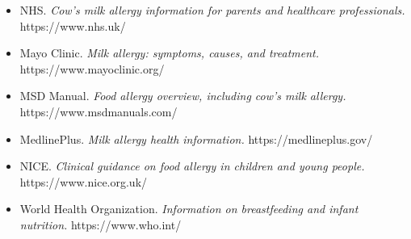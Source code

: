 \begin{itemize}
    \item NHS. \textit{Cow's milk allergy information for parents and healthcare professionals.} https://www.nhs.uk/
    \item Mayo Clinic. \textit{Milk allergy: symptoms, causes, and treatment.} https://www.mayoclinic.org/
    \item MSD Manual. \textit{Food allergy overview, including cow's milk allergy.} https://www.msdmanuals.com/
    \item MedlinePlus. \textit{Milk allergy health information.} https://medlineplus.gov/
    \item NICE. \textit{Clinical guidance on food allergy in children and young people.} https://www.nice.org.uk/
    \item World Health Organization. \textit{Information on breastfeeding and infant nutrition.} https://www.who.int/
\end{itemize}
